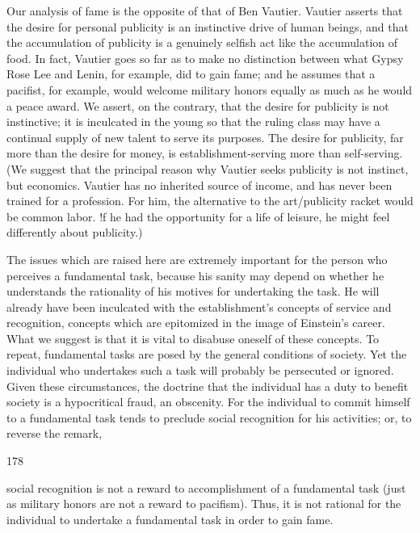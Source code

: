 \documentclass[10pt,twoside]{memoir}
\begin{document}
\begin{enumerate}
{\begin{enumerate}
\begin{sysrules}
\begin{sysrules}
\begin{sysrules}
\begin{sysrules}
{\begin{enumerate}
{{{{{{{Our analysis of fame is the opposite of that of Ben Vautier. Vautier 
asserts that the desire for personal publicity is an instinctive drive of human 
beings, and that the accumulation of publicity is a genuinely selfish act like 
the accumulation of food. In fact, Vautier goes so far as to make no 
distinction between what Gypsy Rose Lee and Lenin, for example, did to 
gain fame; and he assumes that a pacifist, for example, would welcome 
military honors equally as much as he would a peace award. We assert, on 
the contrary, that the desire for publicity is not instinctive; it is inculcated in 
the young so that the ruling class may have a continual supply of new talent 
to serve its purposes. The desire for publicity, far more than the desire for 
money, is establishment-serving more than self-serving. (We suggest that the 
principal reason why Vautier seeks publicity is not instinct, but economics. 
Vautier has no inherited source of income, and has never been trained for a 
profession. For him, the alternative to the art/publicity racket would be 
common labor. !f he had the opportunity for a life of leisure, he might feel 
differently about publicity.) 

The issues which are raised here are extremely important for the person 
who perceives a fundamental task, because his sanity may depend on 
whether he understands the rationality of his motives for undertaking the 
task. He will already have been inculcated with the establishment's concepts 
of service and recognition, concepts which are epitomized in the image of 
Einstein's career. What we suggest is that it is vital to disabuse oneself of 
these concepts. To repeat, fundamental tasks are posed by the general 
conditions of society. Yet the individual who undertakes such a task will 
probably be persecuted or ignored. Given these circumstances, the doctrine 
that the individual has a duty to benefit society is a hypocritical fraud, an 
obscenity. For the individual to commit himself to a fundamental task tends 
to preclude social recognition for his activities; or, to reverse the remark, 


178 


social recognition is not a reward to accomplishment of a fundamental task 
(just as military honors are not a reward to pacifism). Thus, it is not rational 
for the individual to undertake a fundamental task in order to gain fame. 

}}}}}}}
\end{enumerate}}
\end{sysrules}
\end{sysrules}
\end{sysrules}
\end{sysrules}
\end{enumerate}}
\end{enumerate}
\end{document}
